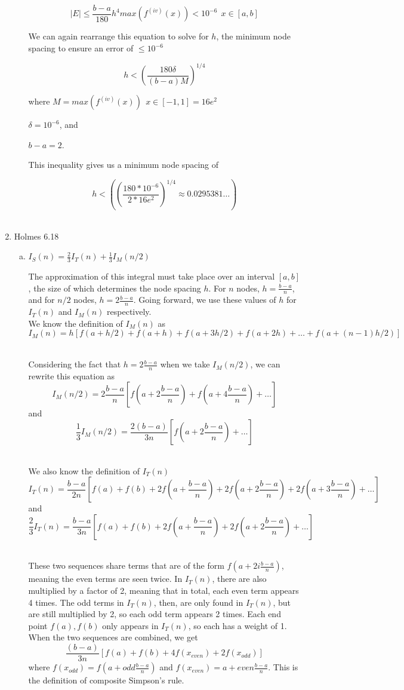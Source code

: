 \documentclass[11pt]{article}
\begin{document}
\begin{enumerate}
\begin{enumerate}
		\[
		|E| \leq \frac{b-a}{180}h^4max(f^{(iv)}(x)) < 10^{-6}\ \ x\in[a,b]
		\]

		We can again rearrange this equation to solve for $h$, the minimum node spacing to ensure an error of $\leq 10^{-6}$

		\[
		h < (\frac{180\delta}{(b-a)M})^{1/4}
		\]

		where $M=max(f^{(iv)}(x))\ \ x\in[-1,1] = 16e^2$

		$\delta = 10^{-6}$, and

		$b-a=2$.

		This inequality gives us a minimum node spacing of

		\[
		h < ((\frac{180*10^{-6}}{2*16e^2})^{1/4} \approx 0.0295381\ldots)
		\] \

	\end{enumerate}

	\item Holmes 6.18

	\begin{enumerate}[(a)]

	\item $I_S(n) = \frac{2}{3}I_T(n) + \frac{1}{3}I_M(n/2)$

	The approximation of this integral must take place over an interval $[a,b]$, the size of which determines the node spacing $h$.
	For $n$ nodes, $h=\frac{b-a}{n}$, and for $n/2$ nodes, $h = 2\frac{b-a}{n}$. Going forward, we use these values of $h$ for $I_T(n)$ and $I_M(n)$ respectively. \\

	We know the definition of $I_M(n)$ as
	\[
	I_M(n) = h[f(a+h/2) + f(a+h) + f(a+3h/2) + f(a+2h) + \ldots + f(a+(n-1)h/2)]
	\] \

	Considering the fact that $h=2\frac{b-a}{n}$ when we take $I_M(n/2)$, we can rewrite this equation as
	\[
	I_M(n/2) = 2\frac{b-a}{n}[f(a+2\frac{b-a}{n}) + f(a+4\frac{b-a}{n}) + \ldots]
	\]
	and
	\[
	\frac{1}{3}I_M(n/2) = \frac{2(b-a)}{3n}[f(a+2\frac{b-a}{n}) + \ldots]
	\] \

	We also know the definition of $I_T(n)$
	\[
	I_T(n) = \frac{b-a}{2n}[f(a) + f(b) + 2f(a+\frac{b-a}{n}) + 2f(a+2\frac{b-a}{n}) + 2f(a+3\frac{b-a}{n})+\ldots]
	\]
	and
	\[
	\frac{2}{3}I_T(n) = \frac{b-a}{3n}[f(a) + f(b) + 2f(a+\frac{b-a}{n}) + 2f(a+2\frac{b-a}{n}) + \ldots]
	\] \

	These two sequences share terms that are of the form $f(a+2i\frac{b-a}{n})$, meaning the even terms are seen twice. In $I_T(n)$, there are also multiplied by a factor of 2, meaning that in total, each even term appears 4 times. The odd terms in $I_T(n)$, then, are only found in $I_T(n)$, but are still multiplied by 2, so each odd term appears 2 times. Each end point $f(a), f(b)$ only appears in $I_T(n)$, so each has a weight of 1. When the two sequences are combined, we get
	\[
	\frac{(b-a)}{3n}[f(a) + f(b) + 4f(x_{even}) + 2f(x_{odd})]
	\]
	where $f(x_{odd}) = f(a+odd\frac{b-a}{n})$ and $f(x_{even}) = a+even\frac{b-a}{n}$. This is the definition of composite Simpson's rule. \\


\end{enumerate}
\end{enumerate}
\end{document}
